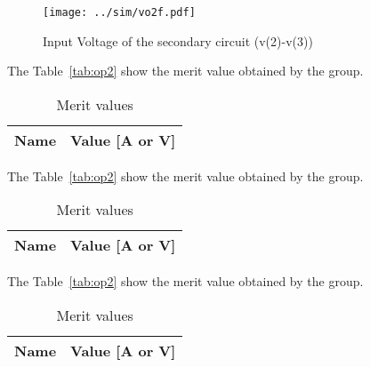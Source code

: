 \begin{figure}[ht!] \centering
\texttt{[image: ../sim/vo2f.pdf]}
\caption{Input Voltage of the secondary circuit (v(2)-v(3))} 
\label{fig:sim2}
\end{figure}

The Table~\ref{tab:op2} show the merit value obtained by the group.
\begin{table}[!ht]
  \centering
  \begin{tabular}{|l|r|}
    \hline    
    {\bf Name} & {\bf Value [A or V]} \\ \hline
    
  \end{tabular}
  \caption{Merit values}
  \label{tab:ng3}
\end{table}


The Table~\ref{tab:op2} show the merit value obtained by the group.
\begin{table}[!ht]
  \centering
  \begin{tabular}{|l|r|}
    \hline    
    {\bf Name} & {\bf Value [A or V]} \\ \hline
    
  \end{tabular}
  \caption{Merit values}
  \label{tab:ng4}
\end{table}


The Table~\ref{tab:op2} show the merit value obtained by the group.
\begin{table}[!ht]
  \centering
  \begin{tabular}{|l|r|}
    \hline    
    {\bf Name} & {\bf Value [A or V]} \\ \hline
    
  \end{tabular}
  \caption{Merit values}
  \label{tab:ng5}
\end{table}


